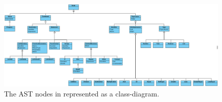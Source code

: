 \begin{figure}[H] 
    \begin{center}
        \includegraphics[width=1.5\textwidth, angle=90]{Files/Billeder: Design/ASTNodes.png}
    \end{center}
    \caption{The AST nodes in \lang represented as a class-diagram.}
    \label{ASTNodes}
\end{figure}
